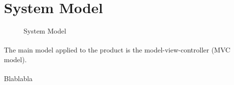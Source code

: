 \newpage
\section{System Model}

\begin{figure}[h!]
\centering
\caption{System Model}
\end{figure}

\paragraph{}The main model applied to the product is the
model-view-controller (MVC model).

\paragraph{}Blablabla